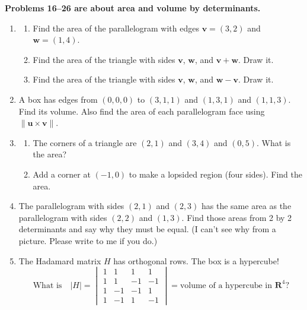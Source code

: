 \documentclass[14pt, a4paper]{article}
\begin{document}
\noindent \textbf{Problems 16--26 are about area and volume by determinants.}
\begin{enumerate}[resume]
    \item
          \begin{enumerate}
              \item Find the area of the parallelogram with edges $\boldsymbol{v} = (3, 2)$ and $\boldsymbol{w} = (1, 4)$.
              \item Find the area of the triangle with sides $\boldsymbol{v}$, $\boldsymbol{w}$, and $\boldsymbol{v} + \boldsymbol{w}$. Draw it.
              \item Find the area of the triangle with sides $\boldsymbol{v}$, $\boldsymbol{w}$, and $\boldsymbol{w} - \boldsymbol{v}$. Draw it.
          \end{enumerate}

    \item A box has edges from $(0, 0, 0)$ to $(3, 1, 1)$ and $(1, 3, 1)$ and $(1, 1, 3)$. Find its volume. Also find the area of each parallelogram face using $\|\boldsymbol{u} \times \boldsymbol{v}\|$.

    \item
          \begin{enumerate}
              \item The corners of a triangle are $(2, 1)$ and $(3, 4)$ and $(0, 5)$. What is the area?
              \item Add a corner at $(-1, 0)$ to make a lopsided region (four sides). Find the area.
          \end{enumerate}

    \item The parallelogram with sides $(2, 1)$ and $(2, 3)$ has the same area as the parallelogram with sides $(2, 2)$ and $(1, 3)$. Find those areas from 2 by 2 determinants and say why they must be equal. (I can't see why from a picture. Please write to me if you do.)

    \item The Hadamard matrix $H$ has orthogonal rows. The box is a hypercube!
          \[
              \text{What is} \quad |H| = \begin{vmatrix} 1 & 1 & 1 & 1 \\ 1 & 1 & -1 & -1 \\ 1 & -1 & -1 & 1 \\ 1 & -1 & 1 & -1 \end{vmatrix} = \text{volume of a hypercube in } \mathbf{R}^4?
          \]


\end{enumerate}
\end{document}
